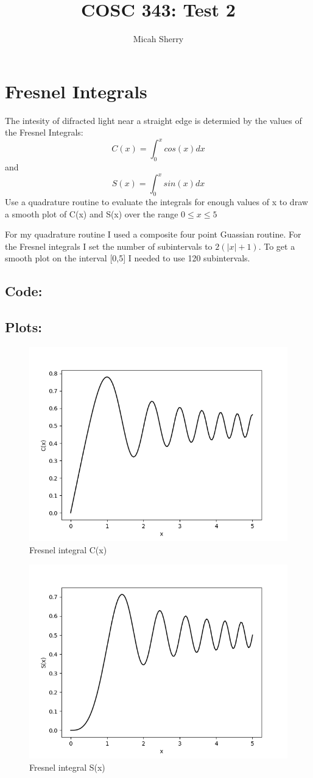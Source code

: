 \documentclass{article}
\title{COSC 343: Test 2}
\author{Micah Sherry}
\begin{document}
\maketitle
\section{Fresnel Integrals}
	The intesity of difracted light near a straight edge is determied by the values of the Fresnel Integrals: 
	$$C(x) = \int_{0}^x cos(x)dx $$ and $$S(x) = \int_{0}^x sin(x)dx $$
	Use a quadrature routine to evaluate the integrals for enough values of x to draw a smooth plot of C(x) and S(x) over the range
	$0 \le x \le 5$

	For my quadrature routine I used a composite four point Guassian routine. 
	For the Fresnel integrals I set the number of subintervals to $2(|x|+1)$.     
	To get a smooth plot on the interval [0,5] I needed to use 120 subintervals.
\subsection*{Code:}
	
\subsection*{Plots:}
	\begin{figure}[hbt!]
		\centering
		\includegraphics[width=.75\linewidth]{C(x)_plot.png}
		\caption{Fresnel integral C(x)}
		\label{fig: Fresnel integrals C(x)}
	\end{figure}
	
	\begin{figure}[hbt!]
		\centering
		\includegraphics[width=.75\linewidth]{S(x)_plot.png}
		\caption{Fresnel integral S(x)}
		\label{fig: Fresnel integrals S(x)}
	\end{figure}
\end{document}
